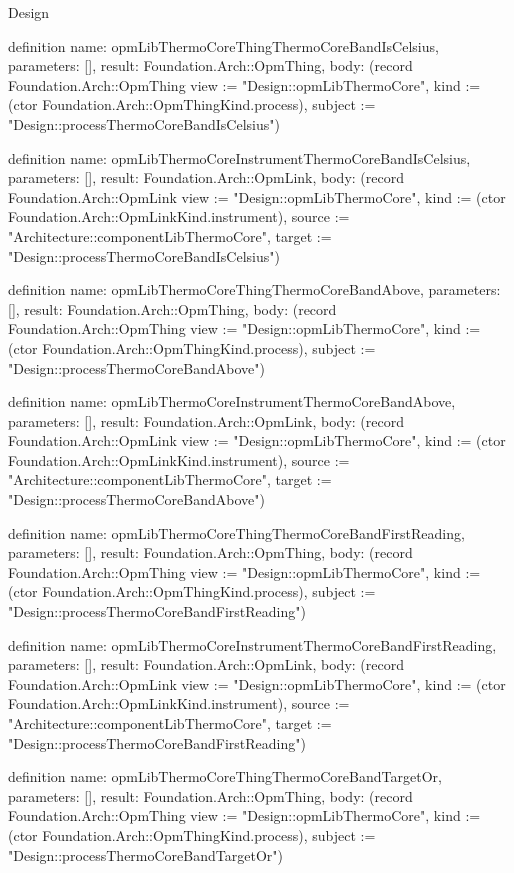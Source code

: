 \begin{lexlean}{Design}
\begin{semanticmodule}
definition{
  name: opmLibThermoCoreThingThermoCoreBandIsCelsius,
  parameters: [],
  result: Foundation.Arch::OpmThing,
  body: (record Foundation.Arch::OpmThing {view := "Design::opmLibThermoCore", kind := (ctor Foundation.Arch::OpmThingKind.process), subject := "Design::processThermoCoreBandIsCelsius"})
}

definition{
  name: opmLibThermoCoreInstrumentThermoCoreBandIsCelsius,
  parameters: [],
  result: Foundation.Arch::OpmLink,
  body: (record Foundation.Arch::OpmLink {view := "Design::opmLibThermoCore", kind := (ctor Foundation.Arch::OpmLinkKind.instrument), source := "Architecture::componentLibThermoCore", target := "Design::processThermoCoreBandIsCelsius"})
}

definition{
  name: opmLibThermoCoreThingThermoCoreBandAbove,
  parameters: [],
  result: Foundation.Arch::OpmThing,
  body: (record Foundation.Arch::OpmThing {view := "Design::opmLibThermoCore", kind := (ctor Foundation.Arch::OpmThingKind.process), subject := "Design::processThermoCoreBandAbove"})
}

definition{
  name: opmLibThermoCoreInstrumentThermoCoreBandAbove,
  parameters: [],
  result: Foundation.Arch::OpmLink,
  body: (record Foundation.Arch::OpmLink {view := "Design::opmLibThermoCore", kind := (ctor Foundation.Arch::OpmLinkKind.instrument), source := "Architecture::componentLibThermoCore", target := "Design::processThermoCoreBandAbove"})
}

definition{
  name: opmLibThermoCoreThingThermoCoreBandFirstReading,
  parameters: [],
  result: Foundation.Arch::OpmThing,
  body: (record Foundation.Arch::OpmThing {view := "Design::opmLibThermoCore", kind := (ctor Foundation.Arch::OpmThingKind.process), subject := "Design::processThermoCoreBandFirstReading"})
}

definition{
  name: opmLibThermoCoreInstrumentThermoCoreBandFirstReading,
  parameters: [],
  result: Foundation.Arch::OpmLink,
  body: (record Foundation.Arch::OpmLink {view := "Design::opmLibThermoCore", kind := (ctor Foundation.Arch::OpmLinkKind.instrument), source := "Architecture::componentLibThermoCore", target := "Design::processThermoCoreBandFirstReading"})
}

definition{
  name: opmLibThermoCoreThingThermoCoreBandTargetOr,
  parameters: [],
  result: Foundation.Arch::OpmThing,
  body: (record Foundation.Arch::OpmThing {view := "Design::opmLibThermoCore", kind := (ctor Foundation.Arch::OpmThingKind.process), subject := "Design::processThermoCoreBandTargetOr"})
}


\end{semanticmodule}
\end{lexlean}

